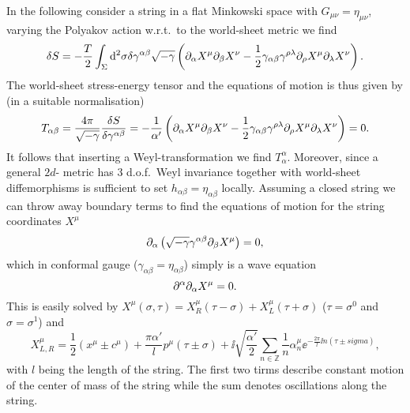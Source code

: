 In the following consider a string in a flat Minkowski space with $G_{\mu\nu}=\eta_{\mu\nu}$, varying the Polyakov action w.r.t.\ to the world-sheet metric we find 
\begin{equation}
    \delta S = -\frac{T}{2}\int_\Sigma \mathrm{d}^2\sigma \delta\gamma^{\alpha\beta}\sqrt{-\gamma}\left(\partial_\alpha X^\mu\partial_\beta X^\nu-\frac{1}{2}\gamma_{\alpha\beta}\gamma^{\rho\lambda}\partial_\rho X^\mu\partial_\lambda X^\nu\right).
\end{equation}
The world-sheet stress-energy tensor and the equations of motion is thus given by (in a suitable normalisation)
\begin{equation}
    T_{\alpha\beta}= \frac{4\pi}{\sqrt{-\gamma}}\frac{\delta S}{\delta\gamma^{\alpha\beta}} = -\frac{1}{\alpha'}\left(\partial_\alpha X^\mu\partial_\beta X^\nu-\frac{1}{2}\gamma_{\alpha\beta}\gamma^{\rho\lambda}\partial_\rho X^\mu\partial_\lambda X^\nu\right) = 0.
\end{equation}
It follows that inserting a Weyl-transformation we find $T^{\alpha}_\alpha$. Moreover, since a general $2d$- metric has $3$ d.o.f.\ Weyl invariance together with world-sheet diffemorphisms is sufficient to set $h_{\alpha\beta}=\eta_{\alpha\beta}$ locally. Assuming a closed string we can throw away boundary terms to find the equations of motion for the string coordinates $X^\mu$
\begin{equation}
    \partial_\alpha\left(\sqrt{-\gamma}\gamma^{\alpha\beta}\partial_\beta X^\mu\right) = 0,
\end{equation}
which in conformal gauge ($\gamma_{\alpha\beta}=\eta_{\alpha\beta}$) simply is a wave equation 
\begin{equation}
    \partial^\alpha\partial_\alpha X^\mu = 0.
\end{equation}
This is easily solved by $X^\mu(\sigma,\tau)=X^\mu_R(\tau-\sigma)+X^\mu_L(\tau+\sigma)$ ($\tau =\sigma^0$ and $\sigma=\sigma^1$) and 
\begin{equation}
    X^\mu_{L,R} = \frac{1}{2}(x^\mu\pm c^\mu)+\frac{\pi\alpha'}{l}p^\mu(\tau\pm\sigma)+\ii \sqrt{\frac{\alpha'}{2}}\sum_{n\in\mathbb{Z}}\frac{1}{n}\alpha^\mu_n\ee^{-\frac{2\pi}{l}\ii n(\tau\pm sigma)},
\end{equation}
with $l$ being the length of the string. The first two tirms describe constant motion of the center of mass of the string while the sum denotes oscillations along the string. 

